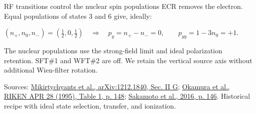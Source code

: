 \documentclass[12pt,a4paper]{article}
\newcommand{\src}[2]{\href{#1}{#2}}
\newcommand{\sakamoto}{https://proceedings.jacow.org/cyclotrons2016/papers/tub04.pdf}
\newcommand{\rfprinciple}{https://arxiv.org/pdf/1212.1840}
\newcommand{\okamura}{https://www.nishina.riken.jp/researcher/APR/Document/ProgressReport_vol_28.pdf}
\newcommand{\source}[1]{\vfill{\color{Muted}\fontsize{10}{13}\selectfont #1\par}}
\begin{document}
\begin{frame}[t]{RF transitions control the nuclear spin populations}
ECR removes the electron. Equal populations of states 3 and 6 give, ideally:\par
\vspace{1mm}
\( (n_+,n_0,n_-)=(\tfrac12,0,\tfrac12)\quad\Longrightarrow\quad
 p_y=n_+-n_-=0,\qquad p_{yy}=1-3n_0=+1.\)\par
\vspace{2mm}
{\fontsize{13}{16}\selectfont The nuclear populations use the strong-field limit and ideal polarization retention. SFT\#1 and WFT\#2 are off. We retain the vertical source axis without additional Wien-filter rotation.}\par
\source{Sources: \src{\rfprinciple}{Mikirtychyants et al., arXiv:1212.1840, Sec. II G}; \src{\okamura}{Okamura et al., RIKEN APR 28 (1995), Table 1, p. 148}; \src{\sakamoto}{Sakamoto et al., 2016, p. 146}. Historical recipe with ideal state selection, transfer, and ionization.}
\note{\notetwo}
\end{frame}

\end{document}

